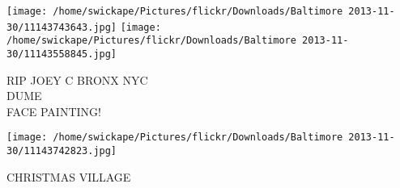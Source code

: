 \documentclass[10pt,letterpaper]{article}
\begin{document}
\vspace{0.25in}
\texttt{[image: /home/swickape/Pictures/flickr/Downloads/Baltimore 2013-11-30/11143743643.jpg]}
\texttt{[image: /home/swickape/Pictures/flickr/Downloads/Baltimore 2013-11-30/11143558845.jpg]}

RIP JOEY C BRONX NYC\\
DUME\\
FACE PAINTING!\\
\pagebreak

\texttt{[image: /home/swickape/Pictures/flickr/Downloads/Baltimore 2013-11-30/11143742823.jpg]}

CHRISTMAS VILLAGE\\
\pagebreak
\end{document}

